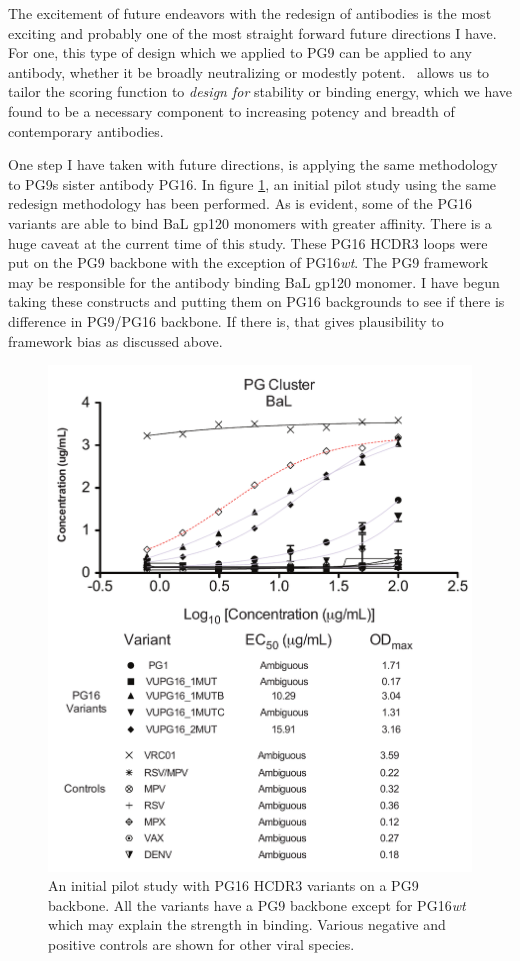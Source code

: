 The excitement of future endeavors with the redesign of antibodies is the most exciting and probably one of the most straight forward future directions I have. For one, this type of design which we applied to PG9 can be applied to any antibody, whether it be broadly neutralizing or modestly potent. \rosetta~allows us to tailor the scoring function to \textit{design for} stability or binding energy, which we have found to be a necessary component to increasing potency and breadth of contemporary antibodies.

One step I have taken with future directions, is applying the same methodology to PG9s sister antibody PG16. In figure \ref{fig:fig5_4}, an initial pilot study using the same redesign methodology has been performed. As is evident, some of the PG16 variants are able to bind BaL gp120 monomers with greater affinity. There is a huge caveat at the current time of this study. These PG16 HCDR3 loops were put on the PG9 backbone with the exception of PG16\textit{wt}. The PG9 framework may be responsible for the antibody binding BaL gp120 monomer. I have begun taking these constructs and putting them on PG16 backgrounds to see if there is difference in PG9/PG16 backbone. If there is, that gives plausibility to framework bias as discussed above.

\begin{figure}[!t]
   \centering
   \includegraphics[scale=.5]{images/chapter5/figure5_4.pdf}
   \caption[Binding Profile of PG16 Variants]{An initial pilot study with PG16 HCDR3 variants on a PG9 backbone. All the variants have a PG9 backbone except for PG16\textit{wt} which may explain the strength in binding. Various negative and positive controls are shown for other viral species.}
    \label{fig:fig5_4}
\end{figure}

